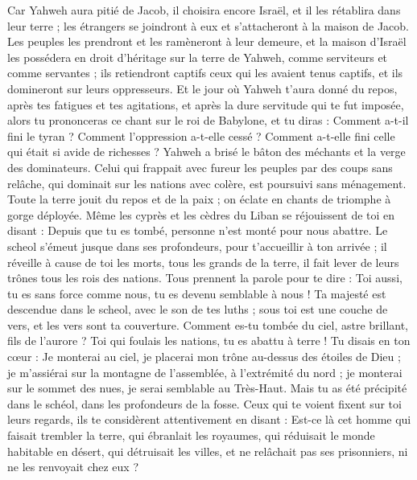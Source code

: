 \begin{multicols}{2}
\VerseOne{}Car Yahweh aura pitié de Jacob, il choisira encore Israël, et il les rétablira dans leur terre ; les étrangers se joindront à eux et s'attacheront à la maison de Jacob.
Les peuples les prendront et les ramèneront à leur demeure, et la maison d'Israël les possédera en droit d'héritage sur la terre de Yahweh, comme serviteurs et comme servantes ; ils retiendront captifs ceux qui les avaient tenus captifs, et ils domineront sur leurs oppresseurs.
Et le jour où Yahweh t'aura donné du repos, après tes fatigues et tes agitations, et après la dure servitude qui te fut imposée,
alors tu prononceras ce chant sur le roi de Babylone, et tu diras : Comment a-t-il fini le tyran ? Comment l'oppression a-t-elle cessé ? Comment a-t-elle fini celle qui était si avide de richesses ?
Yahweh a brisé le bâton des méchants et la verge des dominateurs.
Celui qui frappait avec fureur les peuples par des coups sans relâche, qui dominait sur les nations avec colère, est poursuivi sans ménagement.
Toute la terre jouit du repos et de la paix ; on éclate en chants de triomphe à gorge déployée.
Même les cyprès et les cèdres du Liban se réjouissent de toi en disant : Depuis que tu es tombé, personne n'est monté pour nous abattre.
Le scheol s'émeut jusque dans ses profondeurs, pour t'accueillir à ton arrivée ; il réveille à cause de toi les morts, tous les grands de la terre, il fait lever de leurs trônes tous les rois des nations.
Tous prennent la parole pour te dire : Toi aussi, tu es sans force comme nous, tu es devenu semblable à nous !
Ta majesté est descendue dans le scheol, avec le son de tes luths ; sous toi est une couche de vers, et les vers sont ta couverture.
Comment es-tu tombée du ciel, astre brillant, fils de l'aurore ? Toi qui foulais les nations, tu es abattu à terre !
Tu disais en ton cœur : Je monterai au ciel, je placerai mon trône au-dessus des étoiles de Dieu ; je m'assiérai sur la montagne de l'assemblée, à l'extrémité du nord ;
je monterai sur le sommet des nues, je serai semblable au Très-Haut.
Mais tu as été précipité dans le schéol, dans les profondeurs de la fosse.
Ceux qui te voient fixent sur toi leurs regards, ils te considèrent attentivement en disant : Est-ce là cet homme qui faisait trembler la terre, qui ébranlait les royaumes,
qui réduisait le monde habitable en désert, qui détruisait les villes, et ne relâchait pas ses prisonniers, ni ne les renvoyait chez eux ?

\end{multicols}
